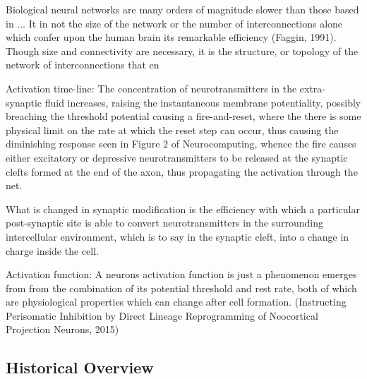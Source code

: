 \documentclass[11pt]{afthesis}
\begin{document}
	Biological neural networks are many orders of magnitude slower than those based in ... It in not the size of the network or the number of interconnections alone which confer upon the human brain its remarkable efficiency (Faggin, 1991). Though size and connectivity are necessary, it is the structure, or topology of the network of interconnections that en
	
	
	Activation time-line: The concentration of neurotransmitters in the extra-synaptic fluid increases, raising the instantaneous membrane potentiality, possibly breaching the threshold potential causing a fire-and-reset, where the there is some physical limit on the rate at which the reset step can occur, thus causing the diminishing response seen in Figure 2 of Neurocomputing, whence the fire causes either excitatory or depressive neurotransmitters to be released at the synaptic clefts formed at the end of the axon, thus propagating the activation through the net.
	
	What is changed in synaptic modification is the efficiency with which a particular post-synaptic site is able to convert neurotransmitters in the surrounding intercellular environment, which is to say in the synaptic cleft, into a change in charge inside the cell.
	
	Activation function: A neurons activation function is just a phenomenon emerges from from the combination of its potential threshold and rest rate, both of which are physiological properties which can change after cell formation. (Instructing Perisomatic Inhibition by Direct Lineage Reprogramming of Neocortical Projection Neurons, 2015)
	
	\subsection{Historical Overview}
	
\end{document}
